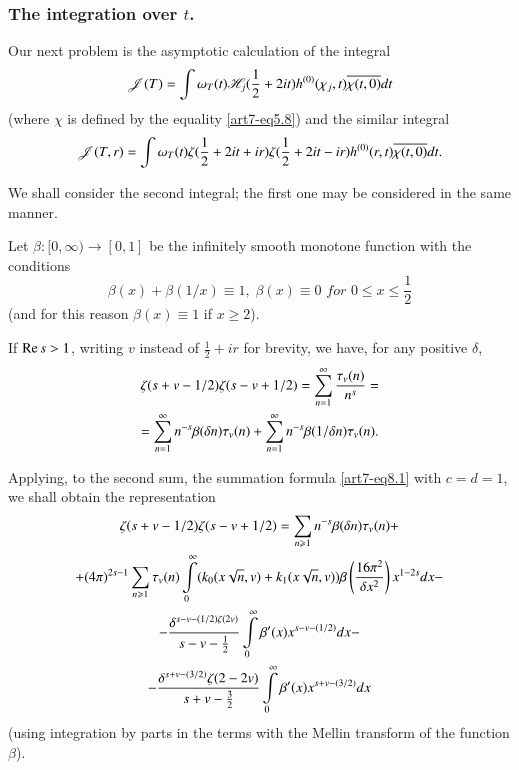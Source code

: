 \subsubsection{The integration over $t$.}\label{art7-subsubsec2.7.2}
Our next problem is the asymptotic calculation of the integral
\begin{equation}
\mathscr{J} (T) = \int \omega_T (t) \mathscr{H}_j (\frac{1}{2} + 2 it) h^{(0)} (\chi_j, t) \overline{\chi (t, 0)} dt \label{art7-eq8.3}
\end{equation}
(where $\chi$ is defined by the equality \eqref{art7-eq5.8}) and the similar integral 
\begin{equation}
\mathscr{J} (T, r) = \int \omega_T (t) \zeta (\frac{1}{2} + 2 it + ir) \zeta (\frac{1}{2} + 2 i t - ir) h^{(0)} (r,t) \overline{\chi (t,0)} dt. 
\label{art7-eq8.4}
\end{equation}

We shall consider the second integral; the first one may be considered in the same manner. 

Let $\beta : [0, \infty) \to [0,1]$ be the infinitely smooth monotone function with the conditions
\begin{equation}
\beta(x) + \beta (1/x) \equiv 1, \; \beta (x) \equiv 0 \textit{ for  } 0 \leqslant x \leqslant \frac{1}{2}
\label{art7-eq8.5}
\end{equation}
(and for this reason $\beta (x) \equiv 1$ if $x \geqslant 2$).

If $\operatorname{Re} s >1$, writing $v$ instead of $\frac{1}{2} + ir $ for brevity, we have, for any positive $\delta$, 
\begin{gather}
\zeta (s + v - 1/2) \zeta (s- v+ 1/2) = \sum\limits^\infty_{n=1} \frac{\tau_v (n)}{n^s} = \label{art7-eq8.6}\\
= \sum\limits^\infty_{n=1} n^{-s} \beta (\delta n) \tau_v (n) + \sum\limits^\infty_{n=1} n^{-s} \beta (1/\delta n) \tau_v (n). \notag
\end{gather}
 
Applying, to the second sum, the summation formula \eqref{art7-eq8.1} with $c = d =1$, we shall obtain the representation 
\begin{gather}
\zeta (s+ v -1/2) \zeta (s - v+ 1/2) = \sum\limits_{n \geqslant 1} n^{-s} \beta (\delta n) \tau_v (n)+\label{art7-eq8.7}\\
+(4\pi)^{2s-1} \sum\limits_{n \geqslant 1} \tau_v (n) \int\limits^\infty_0 (k_0 (x \sqrt{n}, v) + k_1 (x \sqrt{n}, v)) \beta \left(\frac{16 \pi^2}{\delta x^2} \right) x^{1-2s} dx -\notag\\
-\frac{\delta^{s-v-(1/2) \zeta (2v)}}{s-v-\frac{1}{2}} \int\limits^\infty_0 \beta' (x) x^{s-v-(1/2)} dx - \notag\\
- \frac{\delta^{s+v - (3/2)} \zeta (2 -2 v)}{s+v -\frac{3}{2}} \int\limits^\infty_0 \beta' (x) x^{s+v-(3/2)} dx \notag
\end{gather}\pageoriginale 
(using integration by parts in the terms with the Mellin transform of the function $\beta$).

